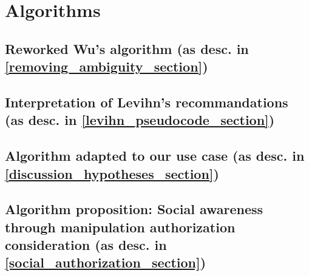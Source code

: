 \chapter{Algorithms}\label{algorithms}

\section{Reworked Wu's algorithm (as desc. in \ref{removing_ambiguity_section})}\label{appendix_reworked_wu_section}





\section{Interpretation of Levihn's recommandations (as desc. in \ref{levihn_pseudocode_section})}\label{appendix_levihn_interpretation_section}







\section{Algorithm adapted to our use case (as desc. in \ref{discussion_hypotheses_section})}\label{appendix_basicmods_section}





\section{Algorithm proposition: Social awareness through manipulation authorization consideration (as desc. in \ref{social_authorization_section})}\label{appendix_observation_section}









